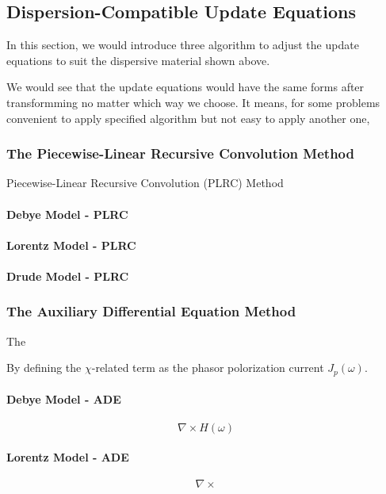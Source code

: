 \subsection{Dispersion-Compatible Update Equations}
In this section, we would introduce three algorithm to adjust the update equations to suit the dispersive material shown
above.

We would see that the update equations would have the same forms after transformming no matter which way we choose. It
means, for some problems convenient to apply specified algorithm but not easy to apply another one, 

\subsubsection{The Piecewise-Linear Recursive Convolution Method}
Piecewise-Linear Recursive Convolution (PLRC) Method

\paragraph{{\msjh Debye Model - PLRC}}

\paragraph{{\msjh Lorentz Model - PLRC}}

\paragraph{{\msjh Drude Model - PLRC}}

\subsubsection{The Auxiliary Differential Equation Method}
The 

By defining the $\chi$-related term as the phasor polorization current $J_p(\omega)$.
\paragraph{{\msjh Debye Model - ADE}}
\begin{equation}
  \nabla \times H(\omega)
\end{equation}

\paragraph{{\msjh Lorentz Model - ADE}}
\begin{equation}
  \nabla \times
\end{equation}

